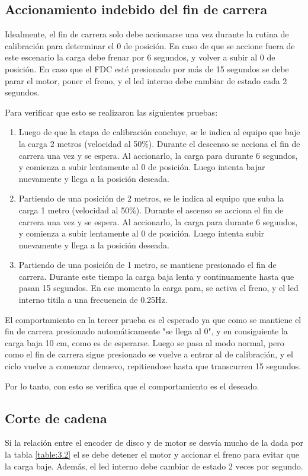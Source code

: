 \subsection{Accionamiento indebido del fin de carrera}
Idealmente, el fin de carrera solo debe accionarse una vez durante la rutina de calibración para determinar el 0 de posición. En caso de que se accione fuera de este escenario la carga debe frenar por 6 segundos, y volver a subir al 0 de posición. En caso que el FDC esté presionado por más de 15 segundos se debe parar el motor, poner el freno, y el led interno debe cambiar de estado cada 2 segundos.

Para verificar que esto se realizaron las siguientes pruebas:
\begin{enumerate}
	\item Luego de que la etapa de calibración concluye, se le indica al equipo que baje la carga 2 metros (velocidad al 50\%). Durante el descenso se acciona el fin de carrera una vez y se espera. Al accionarlo, la carga para durante 6 segundos, y comienza a subir lentamente al 0 de posición. Luego intenta bajar nuevamente y llega a la posición deseada.
	\item Partiendo de una posición de 2 metros, se le indica al equipo que suba la carga 1 metro (velocidad al 50\%). Durante el ascenso se acciona el fin de carrera una vez y se espera. Al accionarlo, la carga para durante 6 segundos, y comienza a subir lentamente al 0 de posición. Luego intenta subir nuevamente y llega a la posición deseada.
	\item Partiendo de una posición de 1 metro, se mantiene presionado el fin de carrera. Durante este tiempo la carga baja lenta y continuamente hasta que pasan 15 segundos. En ese momento la carga para, se activa el freno, y el led interno titila a una frecuencia de 0.25Hz.
\end{enumerate}

El comportamiento en la tercer prueba es el esperado ya que como se mantiene el fin de carrera presionado automáticamente "se llega al 0", y en consiguiente la carga baja 10 cm, como es de esperarse. Luego se pasa al modo normal, pero como el fin de carrera sigue presionado se vuelve a entrar al de calibración, y el ciclo vuelve a comenzar denuevo, repitiendose hasta que transcurren 15 segundos.

Por lo tanto, con esto se verifica que el comportamiento es el deseado.
	
\subsection{Corte de cadena}
Si la relación entre el encoder de disco y de motor se desvía mucho de la dada por la tabla \ref{table:3.2} el se debe detener el motor y accionar el freno para evitar que la carga baje. Además, el led interno debe cambiar de estado 2 veces por segundo.

